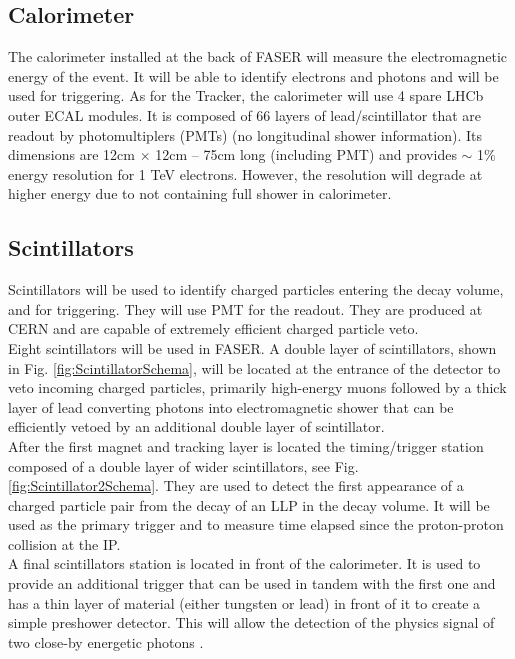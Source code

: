 \subsection{Calorimeter}

The calorimeter installed at the back of FASER will measure the electromagnetic energy of the event. It will be able to identify electrons and photons and will be used for triggering. As for the Tracker, the calorimeter will use 4 spare LHCb outer ECAL modules.
It is composed of 66 layers of lead/scintillator that are readout by photomultiplers (PMTs) (no longitudinal shower information). Its dimensions are 12cm $\times$ 12cm – 75cm long (including PMT) and provides $\sim$ 1\% energy resolution for 1 TeV electrons. However, the resolution will degrade at higher energy due to not containing full shower in calorimeter.

\subsection{Scintillators}

Scintillators will be used to identify charged particles entering the decay volume, and for triggering. They will use PMT for the readout. They are produced at CERN and are capable of extremely efficient charged particle veto.\\
Eight scintillators will be used in FASER. A double layer of scintillators, shown in Fig. \ref{fig:ScintillatorSchema}, will be located at the entrance of the detector to veto incoming charged particles, primarily high-energy muons followed by a thick layer of lead converting photons into electromagnetic shower that can be efficiently vetoed by an additional double layer of scintillator.\\
After the first magnet and tracking layer is located the timing/trigger station composed of a double layer of wider scintillators, see Fig. \ref{fig:Scintillator2Schema}. They are used to detect the first appearance of a charged particle pair from the decay of an LLP in the decay volume. It will be used as the primary trigger and to measure time elapsed since the proton-proton collision at the IP.\\
A final scintillators station is located in front of the calorimeter. It is used to provide an additional trigger that can be used in tandem with the first one and has a thin layer of material (either tungsten or lead) in front of it to create a simple preshower detector. This will allow the detection of the physics signal of two close-by energetic photons
 \cite{faser_collaboration_technical_2018}.

